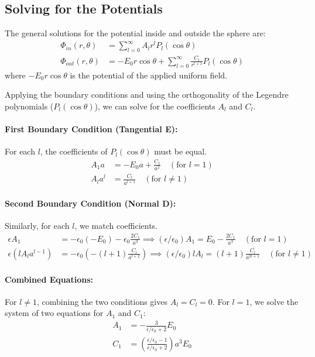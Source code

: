\documentclass{article}
\begin{document}
	\subsection{Solving for the Potentials}
	
	The general solutions for the potential inside and outside the sphere are:
	\begin{align*}
		\Phi_{in}(r, \theta) &= \sum_{l=0}^{\infty} A_l r^l P_l(\cos\theta) \\
		\Phi_{out}(r, \theta) &= -E_0 r \cos\theta + \sum_{l=0}^{\infty} \frac{C_l}{r^{l+1}} P_l(\cos\theta)
	\end{align*}
	where $-E_0 r \cos\theta$ is the potential of the applied uniform field.
	
	Applying the boundary conditions and using the orthogonality of the Legendre polynomials ($P_l(\cos\theta)$), we can solve for the coefficients $A_l$ and $C_l$.
	
	\paragraph{First Boundary Condition (Tangential E):}
	For each $l$, the coefficients of $P_l(\cos\theta)$ must be equal.
	\begin{align*}
		A_1 a &= -E_0 a + \frac{C_1}{a^2} \quad (\text{for } l=1) \\
		A_l a^l &= \frac{C_l}{a^{l+1}} \quad (\text{for } l \neq 1)
	\end{align*}
	
	\paragraph{Second Boundary Condition (Normal D):}
	Similarly, for each $l$, we match coefficients.
	\begin{align*}
		\epsilon A_1 &= -\epsilon_0(-E_0) - \epsilon_0 \frac{2C_1}{a^3} \implies (\epsilon/\epsilon_0)A_1 = E_0 - \frac{2C_1}{a^3} \quad (\text{for } l=1) \\
		\epsilon (l A_l a^{l-1}) &= -\epsilon_0 \left( -(l+1)\frac{C_l}{a^{l+2}} \right) \implies (\epsilon/\epsilon_0) l A_l = (l+1)\frac{C_l}{a^{2l+1}} \quad (\text{for } l \neq 1)
	\end{align*}
	
	\paragraph{Combined Equations:}
	For $l \neq 1$, combining the two conditions gives $A_l = C_l = 0$.
	For $l=1$, we solve the system of two equations for $A_1$ and $C_1$:
	\begin{align*}
		A_1 &= -\frac{3}{\epsilon/\epsilon_0 + 2} E_0 \\
		C_1 &= \left( \frac{\epsilon/\epsilon_0 - 1}{\epsilon/\epsilon_0 + 2} \right) a^3 E_0
	\end{align*}
	
\end{document}
